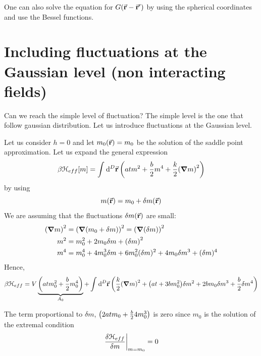 \documentclass[../main/main.tex]{subfiles}
\begin{document}
One can also solve the equation for \( G(\va{r}- \va{r}') \)   by using the spherical coordinates and use the Bessel functions.


\section{Including fluctuations at the Gaussian level (non interacting fields)}
Can we reach the simple level of fluctuation? The simple level is the one that follow gaussian distribution.
Let us introduce fluctuations at the Gaussian level.

Let us consider \( h=0 \) and let \( m_0 (\va{r})= m_0 \) be the solution of the saddle point approximation. Let us expand the general expression
\begin{equation}
  \beta \mathcal{H}_{eff}  [m] = \int_{}^{} \dd[D]{\va{r}} \qty( a t m^2 + \frac{b}{2} m^4 + \frac{k}{2} \qty(\grad m)^2 )
\end{equation}
by using
\begin{equation}
  m(\va{r}) = m_0 + \delta m(\va{r})
\end{equation}
We are assuming that the fluctuations \(  \delta m(\va{r})\) are small:
\begin{subequations}
\begin{align}
   \qty(\grad m)^2 &= \qty(\grad \qty(m_0 + \delta m) )^2 = \qty(\grad \qty(\delta m) )^2  \\
     m^2 &= m_0^2 + 2 m_0 \delta m + \qty(\delta m)^2 \\
     m^4 &= m_0^4 + 4 m_0^3 \delta m + 6 m_0^2 (\delta m)^2 + 4 m_0 \delta m^3 + (\delta m)^4
\end{align}
\end{subequations}
Hence,
\begin{equation}
  \beta \mathcal{H}_{eff} = V \underbrace{ \qty(a t m_0^2 + \frac{b}{2} m_0^4) }_{A_0}
  + \int_{}^{} \dd[D]{\va{r}} \qty(\frac{k}{2}\qty(\grad m)^2 + \qty(a t + 3 b m_0^2)\delta  m^2 + 2 b m_0 \delta m^3 + \frac{b}{2} \delta m^4 )
\end{equation}
\begin{remark}
The term proportional to \( \delta m \),  \( \qty( 2 a t m_0  + \frac{b}{2} 4 m_0^3 )  \) is zero since \( m_0 \) is the solution of the extremal condition
\begin{equation}
  \eval{\frac{\delta \mathcal{H}_{eff}}{\delta m}}_{m=m_0} = 0
\end{equation}
\end{remark}
\end{document}
